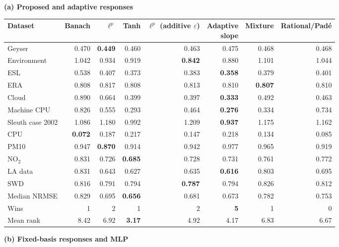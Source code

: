 \par\smallskip\textbf{(a) Proposed and adaptive responses}\par\smallskip
\begin{tabular}{lrrrrrrr}
\toprule
Dataset & Banach & $\ell^p$ & Tanh & \shortstack{$\ell^p$\\(additive $\varepsilon$)} & \shortstack{Adaptive\\slope} & Mixture & Rational/Pad\'e \\
\midrule
Geyser & 0.470 & \textbf{0.449} & 0.460 & 0.463 & 0.475 & 0.468 & 0.468 \\
Environment & 1.042 & 0.934 & 0.919 & \textbf{0.842} & 0.880 & 1.101 & 1.044 \\
ESL & 0.538 & 0.407 & 0.373 & 0.383 & \textbf{0.358} & 0.379 & 0.401 \\
ERA & 0.808 & 0.817 & 0.808 & 0.813 & 0.810 & \textbf{0.807} & 0.810 \\
Cloud & 0.890 & 0.664 & 0.399 & 0.397 & \textbf{0.333} & 0.492 & 0.463 \\
Machine CPU & 0.826 & 0.555 & 0.293 & 0.464 & \textbf{0.276} & 0.334 & 0.734 \\
Sleuth case 2002 & 1.086 & 1.180 & 0.992 & 1.209 & \textbf{0.937} & 1.175 & 1.162 \\
CPU & \textbf{0.072} & 0.187 & 0.217 & 0.147 & 0.218 & 0.134 & 0.085 \\
PM10 & 0.947 & \textbf{0.870} & 0.914 & 0.942 & 0.977 & 0.965 & 0.919 \\
NO$_2$ & 0.831 & 0.726 & \textbf{0.685} & 0.728 & 0.731 & 0.761 & 0.772 \\
LA data & 0.831 & 0.643 & 0.627 & 0.635 & \textbf{0.616} & 0.803 & 0.695 \\
SWD & 0.816 & 0.791 & 0.794 & \textbf{0.787} & 0.794 & 0.826 & 0.812 \\
\midrule
Median NRMSE & 0.829 & 0.695 & \textbf{0.656} & 0.681 & 0.673 & 0.782 & 0.753 \\
Wins & 1 & 2 & 1 & 2 & \textbf{5} & 1 & 0 \\
Mean rank & 8.42 & 6.92 & \textbf{3.17} & 4.92 & 4.17 & 6.83 & 6.67 \\
\bottomrule\end{tabular}
\par\smallskip\textbf{(b) Fixed-basis responses and MLP}\par\smallskip
